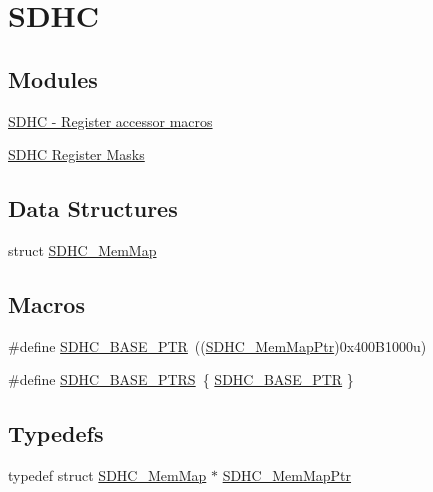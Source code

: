 \hypertarget{group___s_d_h_c___peripheral}{}\section{S\+D\+H\+C}
\label{group___s_d_h_c___peripheral}
\subsection*{Modules}
\begin{DoxyCompactItemize}
\item 
\hyperlink{group___s_d_h_c___register___accessor___macros}{S\+D\+H\+C -\/ Register accessor macros}
\item 
\hyperlink{group___s_d_h_c___register___masks}{S\+D\+H\+C Register Masks}
\end{DoxyCompactItemize}
\subsection*{Data Structures}
\begin{DoxyCompactItemize}
\item 
struct \hyperlink{struct_s_d_h_c___mem_map}{S\+D\+H\+C\+\_\+\+Mem\+Map}
\end{DoxyCompactItemize}
\subsection*{Macros}
\begin{DoxyCompactItemize}
\item 
\#define \hyperlink{group___s_d_h_c___peripheral_gaf6d94732d48040eef799143f86be859c}{S\+D\+H\+C\+\_\+\+B\+A\+S\+E\+\_\+\+P\+T\+R}~((\hyperlink{group___s_d_h_c___peripheral_ga6da8531f7cf8afb4899b93b54ac58054}{S\+D\+H\+C\+\_\+\+Mem\+Map\+Ptr})0x400\+B1000u)
\item 
\#define \hyperlink{group___s_d_h_c___peripheral_gaba68469bfde58472af9853b68fee61de}{S\+D\+H\+C\+\_\+\+B\+A\+S\+E\+\_\+\+P\+T\+R\+S}~\{ \hyperlink{group___s_d_h_c___peripheral_gaf6d94732d48040eef799143f86be859c}{S\+D\+H\+C\+\_\+\+B\+A\+S\+E\+\_\+\+P\+T\+R} \}
\end{DoxyCompactItemize}
\subsection*{Typedefs}
\begin{DoxyCompactItemize}
\item 
typedef struct \hyperlink{struct_s_d_h_c___mem_map}{S\+D\+H\+C\+\_\+\+Mem\+Map} $\ast$ \hyperlink{group___s_d_h_c___peripheral_ga6da8531f7cf8afb4899b93b54ac58054}{S\+D\+H\+C\+\_\+\+Mem\+Map\+Ptr}
\end{DoxyCompactItemize}


